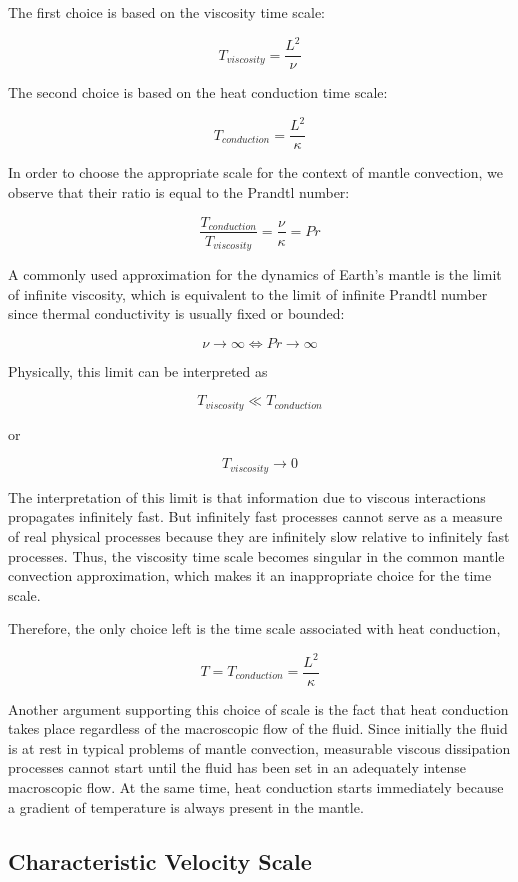 The first choice is based on the viscosity time scale:

$$ T_{viscosity} = \frac{L^2}{\nu} $$

The second choice is based on the heat conduction time scale: 

$$ T_{conduction} = \frac{L^2}{\kappa} $$

In order to choose the appropriate scale for the context of mantle convection, we observe that their ratio is equal to the Prandtl number:

$$ \frac{T_{conduction}}{T_{viscosity}} = \frac{\nu}{\kappa} = Pr $$ 

A commonly used approximation for the dynamics of Earth's mantle is the limit of infinite viscosity, which is equivalent to the limit of infinite Prandtl number since thermal conductivity is usually fixed or bounded: \cite[p. 267]{mantle_conv_in_earth_and_planets}

$$ \nu \longrightarrow \infty \Longleftrightarrow Pr \longrightarrow \infty$$

Physically, this limit can be interpreted as

$$ T_{viscosity} \ll T_{conduction} $$

or 

$$ T_{viscosity} \longrightarrow 0 $$

The interpretation of this limit is that information due to viscous interactions propagates infinitely fast. But infinitely fast processes cannot serve as a measure of real physical processes because they are infinitely slow relative to infinitely fast processes. Thus, the viscosity time scale becomes singular in the common mantle convection approximation, which makes it an inappropriate choice for the time scale.

Therefore, the only choice left is the time scale associated with heat conduction,

$$ T = T_{conduction} = \frac{L^2}{\kappa} $$

Another argument supporting this choice of scale is the fact that heat conduction takes place regardless of the macroscopic flow of the fluid. Since initially the fluid is at rest in typical problems of mantle convection, measurable viscous dissipation processes cannot start until the fluid has been set in an adequately intense macroscopic flow. At the same time, heat conduction starts immediately because a gradient of temperature is always present in the mantle.

\subsection{Characteristic Velocity Scale}

